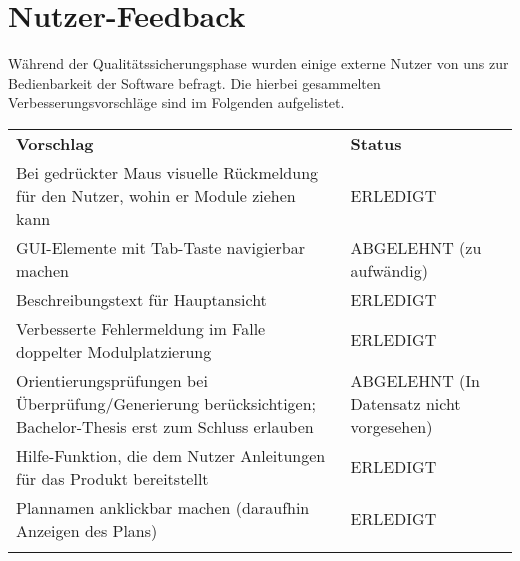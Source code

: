 \FloatBarrier
\section{Nutzer-Feedback}

Während der Qualitätssicherungsphase wurden einige externe Nutzer von uns zur Bedienbarkeit der Software befragt. Die hierbei gesammelten Verbesserungsvorschläge sind im Folgenden aufgelistet.

\begin{longtable}{| >{\hspace{0pt}} p{} | >{\hspace{0pt}} p{} | }
	\hline
	\textbf{Vorschlag} & \textbf{Status} \\ 
	\hhline{|=|=|}
	\endfirsthead
	\endhead
	Bei gedrückter Maus visuelle Rückmeldung für den Nutzer, wohin er Module ziehen kann 
	& ERLEDIGT \\
	\hline
	GUI-Elemente mit Tab-Taste navigierbar machen 
	& ABGELEHNT (zu aufwändig) \\
	\hline 
	Beschreibungstext für Hauptansicht 
	& ERLEDIGT \\
	\hline
	Verbesserte Fehlermeldung im Falle doppelter Modulplatzierung
	& ERLEDIGT \\
	\hline
	Orientierungsprüfungen bei Überprüfung/Generierung berücksichtigen; Bachelor-Thesis erst zum Schluss erlauben
	& ABGELEHNT (In Datensatz nicht vorgesehen) \\
	\hline
	Hilfe-Funktion, die dem Nutzer Anleitungen für das Produkt bereitstellt
	& ERLEDIGT \\
	\hline
	Plannamen anklickbar machen (daraufhin Anzeigen des Plans)
	& ERLEDIGT \\
	\hhline{|=|=|}
\end{longtable}